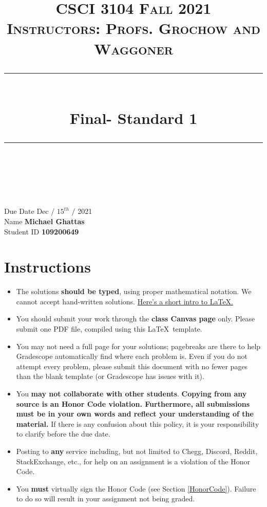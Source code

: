 \documentclass[11pt]{article}
\title{
\normalfont \normalsize 
\textsc{CSCI 3104 Fall 2021 \\ 
Instructors: Profs. Grochow and Waggoner} \\
[10pt] 
\rule{\linewidth}{0.5pt} \\[6pt] 
\huge Final- Standard 1 \\
\rule{\linewidth}{2pt}  \\[10pt]
}
\date{}
\theoremstyle{definition}
\theoremstyle{definition}
\theoremstyle{definition}
\begin{document}
\maketitle


\noindent
Due Date \dotfill Dec / $15^{th}$ / 2021 \\
Name \dotfill \textbf{Michael Ghattas} \\
Student ID \dotfill \textbf{109200649} \\


\tableofcontents

\section{Instructions}
 \begin{itemize}
	\item The solutions \textbf{should be typed}, using proper mathematical notation. We cannot accept hand-written solutions. \href{http://ece.uprm.edu/~caceros/latex/introduction.pdf}{Here's a short intro to \LaTeX.}
	\item You should submit your work through the \textbf{class Canvas page} only. Please submit one PDF file, compiled using this \LaTeX \ template.
	\item You may not need a full page for your solutions; pagebreaks are there to help Gradescope automatically find where each problem is. Even if you do not attempt every problem, please submit this document with no fewer pages than the blank template (or Gradescope has issues with it).

	\item You \textbf{may not collaborate with other students}. \textbf{Copying from any source is an Honor Code violation. Furthermore, all submissions must be in your own words and reflect your understanding of the material.} If there is any confusion about this policy, it is your responsibility to clarify before the due date. 

	\item Posting to \textbf{any} service including, but not limited to Chegg, Discord, Reddit, StackExchange, etc., for help on an assignment is a violation of the Honor Code.

	\item You \textbf{must} virtually sign the Honor Code (see Section \ref{HonorCode}). Failure to do so will result in your assignment not being graded.
\end{itemize}
\end{document}
